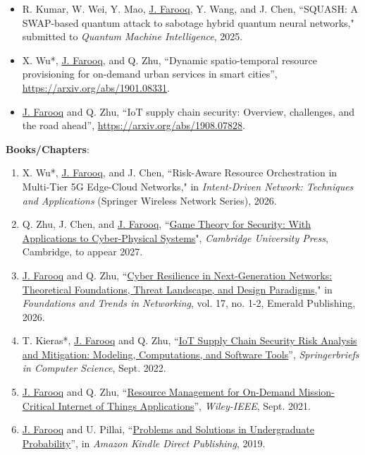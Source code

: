 \documentclass[letterpaper,11pt]{article}
\newcommand{\resumeItem}[2]{
  \item\small{
    \textbf{#1}{: #2 \vspace{-2pt}}
  }
}
\newcommand{\resumeSubItem}[2]{\resumeItem{#1}{#2}\vspace{-4pt}}
\begin{document}
\begin{itemize}
   \item[\rm{[U3]}] R. Kumar, W. Wei, Y. Mao, \underline{J. Farooq}, Y. Wang, and J. Chen, ``SQUASH: A SWAP-based quantum attack to sabotage hybrid quantum neural networks," submitted to \emph{Quantum Machine Intelligence}, 2025.
   \item[\rm{[U2]}] X. Wu*, \underline{J. Farooq}, and Q. Zhu, ``Dynamic spatio-temporal resource provisioning for on-demand urban services in smart cities'', \url{https://arxiv.org/abs/1901.08331}.
   \item[\rm{[U1]}] \underline{J. Farooq} and Q. Zhu, ``IoT supply chain security: Overview, challenges, and the road ahead'', \url{https://arxiv.org/abs/1908.07828}.
   \end{itemize}

    \resumeSubItem{Books/Chapters}{}
      \justifying
      \begin{enumerate}
      \item[\rm{[BC1]}] X. Wu*, \underline{J. Farooq}, and J. Chen, ``Risk-Aware Resource Orchestration in Multi-Tier 5G Edge-Cloud Networks," in \emph{Intent-Driven Network: Techniques and Applications} (Springer Wireless Network Series), 2026.
      \item[\rm{[B5]}] Q. Zhu, J. Chen, and \underline{J. Farooq}, ``\href{https://quanyan8.github.io/game-theory-for-security/}{Game Theory for Security: With Applications to Cyber-Physical Systems}", \textit{Cambridge University Press}, Cambridge, to appear 2027.
      \item[\rm{[B4]}] \underline{J. Farooq} and Q. Zhu, ``\href{https://www.emerald.com/ftnet/article-abstract/17/1-2/1/1393487/Cyber-resilience-in-next-generation-networks}{Cyber Resilience in Next-Generation Networks: Theoretical Foundations, Threat Landscape, and Design Paradigms,}" in \emph{Foundations and Trends in Networking}, vol. 17, no. 1-2, Emerald Publishing, 2026.
      \item[\rm{[B3]}] T. Kieras*, \underline{J. Farooq} and Q. Zhu, ``\href{https://link.springer.com/book/9783031084799}{IoT Supply Chain Security Risk Analysis and Mitigation: Modeling, Computations, and Software Tools}'', \textit{Springerbriefs in Computer Science}, Sept. 2022.
      \item[\rm{[B2]}] \underline{J. Farooq} and Q. Zhu, ``\href{https://www.wiley.com/en-us/Resource+Management+for+On+Demand+Mission+Critical+Internet+of+Things+Applications-p-9781119716099}{Resource Management for On-Demand Mission-Critical Internet of Things Applications}'', \textit{Wiley-IEEE}, Sept. 2021.
     \item[\rm{[B1]}] \underline{J. Farooq} and U. Pillai, ``\href{https://www.amazon.com/Problems-Solutions-Undergraduate-Probability-Muhammad-ebook/dp/B07MH8K9J6}{Problems and Solutions in Undergraduate Probability}'', in \textit{Amazon Kindle Direct Publishing}, 2019.
      \end{enumerate}
\end{document}
